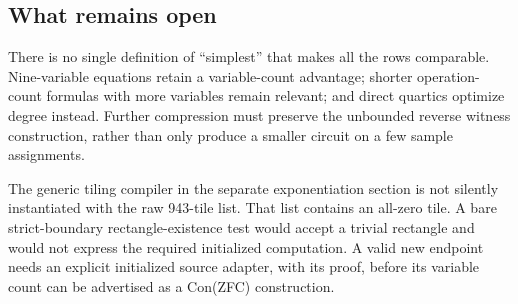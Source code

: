 \subsection{What remains open}
There is no single definition of ``simplest'' that makes all the rows
comparable. Nine-variable equations retain a variable-count advantage;
shorter operation-count formulas with more variables remain relevant;
and direct quartics optimize degree instead. Further compression must
preserve the unbounded reverse witness construction, rather than only
produce a smaller circuit on a few sample assignments.

The generic tiling compiler in the separate exponentiation section is not
silently instantiated with the raw 943-tile list. That list contains an
all-zero tile. A bare strict-boundary rectangle-existence test would accept
a trivial rectangle and would not express the required initialized
computation. A valid new endpoint needs an explicit initialized source
adapter, with its proof, before its variable count can be advertised as a
Con(ZFC) construction.
